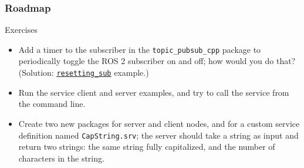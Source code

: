 \documentclass[aspectratio=169]{beamer}
\begin{document}
\frame{\titlepage}



\begin{frame}
	\frametitle{Roadmap}
	\tableofcontents
\end{frame}





\begin{frame}{Exercises}
	\begin{itemize}
    \item Add a timer to the subscriber in the \texttt{topic\_pubsub\_cpp} package to periodically toggle the ROS 2 subscriber on and off; how would you do that?\\
    (Solution: \href{https://github.com/IntelligentSystemsLabUTV/ros2-examples/blob/humble/src/cpp/topic_pubsub_cpp/src/resetting_sub.cpp}{\color{blue}\underline{\texttt{resetting\_sub}}} example.)
		\item Run the service client and server examples, and try to call the service from the command line.
		\item Create two new packages for server and client nodes, and for a custom service definition named \texttt{CapString.srv}; the server should take a string as input and return two strings: the same string fully capitalized, and the number of characters in the string.
	\end{itemize}
\end{frame}
\end{document}
